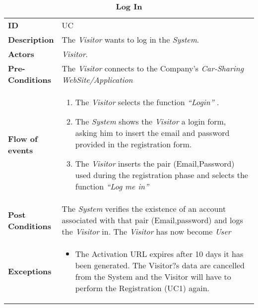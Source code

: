 \begin{longtable}{|p{0.2\linewidth} p{0.8\linewidth}|}
	\captionsetup{labelformat=empty} %
	\caption{\textbf{Log In}} %
	\label{UC_Login}%
	\\ \hline %
	
	\textbf{ID} & UC\theUseCaseIdCounter \\ \hline
	\textbf{Description} & The \emph{Visitor} wants to log in the \emph{System}. \\ \hline
	\textbf{Actors} & \emph{Visitor}.\\ \hline
	\textbf{Pre-Conditions} & The \emph{Visitor} connects to the Company's \emph{Car-Sharing WebSite/Application} \\ \hline
	\textbf{Flow of events} & 
	\begin{enumerate}
		\item The \emph{Visitor} selects the function \textit{\textquotedblleft{Login}\textquotedblright} .
		\item The \emph{System} shows the \emph{Visitor} a login form, asking him to insert the email and password provided in the registration form.
		\item The \emph{Visitor} inserts the pair (Email,Password) used during the registration phase and selects the function \textit{\textquotedblleft{Log me in}\textquotedblright}
	\end{enumerate}	 \\ \hline
	\textbf{Post Conditions} & The \emph{System} verifies the existence of an account associated with that pair (Email,password) and logs the \emph{Visitor} in. The \emph{Visitor} has now become \emph{User}  \\ \hline
	\textbf{Exceptions} & 
	\begin{itemize}
		\item The Activation URL expires after 10 days it has been generated. The Visitor?s data are cancelled from the System and the Visitor will have to perform the Registration (UC1) again.
	\end{itemize} \\ \hline
\end{longtable}

